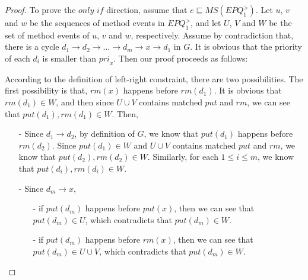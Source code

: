 \begin {proof}

To prove the $\textit{only if}$ direction, assume that $e \sqsubseteq \textit{MS}(\textit{EPQ}_1^{>})$. Let $u$, $v$ and $w$ be the sequences of method events in $\textit{EPQ}_1^{>}$, and let $U$, $V$ and $W$ be the set of method events of $u$, $v$ and $w$, respectively. Assume by contradiction that, there is a cycle $d_1 \rightarrow d_2 \rightarrow \ldots \rightarrow d_m \rightarrow x \rightarrow d_1$ in $G$. It is obvious that the priority of each $d_i$ is smaller than $\textit{pri}_x$. Then our proof proceeds as follows:

According to the definition of left-right constraint, there are two possibilities. The first possibility is that, $\textit{rm}(x)$ happens before $\textit{rm}(d_1)$. It is obvious that $\textit{rm}(d_1) \in W$, and then since $U \cup V$ contains matched $\textit{put}$ and $\textit{rm}$, we can see that $\textit{put}(d_1),\textit{rm}(d_1) \in W$. Then,

\begin{itemize}
\setlength{\itemsep}{0.5pt}
\item[-] Since $d_1 \rightarrow d_2$, by definition of $G$, we know that $\textit{put}(d_1)$ happens before $\textit{rm}(d_2)$. Since $\textit{put}(d_1) \in W$ and $U \cup V$ contains matched $\textit{put}$ and $\textit{rm}$, we know that $\textit{put}(d_2),\textit{rm}(d_2) \in W$. Similarly, for each $1 \leq i \leq m$, we know that $\textit{put}(d_i),\textit{rm}(d_i) \in W$.

\item[-] Since $d_m \rightarrow x$,
    \begin{itemize}
    \setlength{\itemsep}{0.5pt}
    \item[-] if $\textit{put}(d_m)$ happens before $\textit{put}(x)$, then we can see that $\textit{put}(d_m) \in U$, which contradicts that $\textit{put}(d_m) \in W$.

    \item[-] if $\textit{put}(d_m)$ happens before $\textit{rm}(x)$, then we can see that $\textit{put}(d_m) \in U \cup V$, which contradicts that $\textit{put}(d_m) \in W$.
    \end{itemize}
\end{itemize}


\end{proof}

